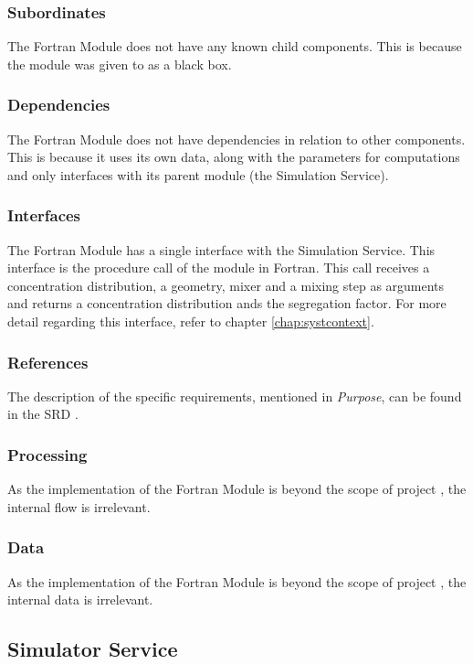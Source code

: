\subsubsection*{Subordinates}
The Fortran Module does not have any known child components. This is because the module was given to \projectauthor{} as a black box.

\subsubsection*{Dependencies}
The Fortran Module does not have dependencies in relation to other components. This is because it uses its own data, along with the parameters for computations and only interfaces with its parent module (the Simulation Service).

\subsubsection*{Interfaces}
The Fortran Module has a single interface with the Simulation Service. This interface is the procedure call of the module in Fortran. This call receives a concentration distribution, a geometry, mixer and a mixing step as arguments and returns a concentration distribution ands the segregation factor. For more detail regarding this interface, refer to chapter \ref{chap:systcontext}.

\subsubsection*{References}
The description of the specific requirements, mentioned in \emph{Purpose}, can be found in the SRD \cite{srd}.

\subsubsection*{Processing}
As the implementation of the Fortran Module is beyond the scope of project \projectname{}, the internal flow is irrelevant.

\subsubsection*{Data}
As the implementation of the Fortran Module is beyond the scope of project \projectname{}, the internal data is irrelevant.

\subsection{Simulator Service}
\label{subsec:simulatorservice}

